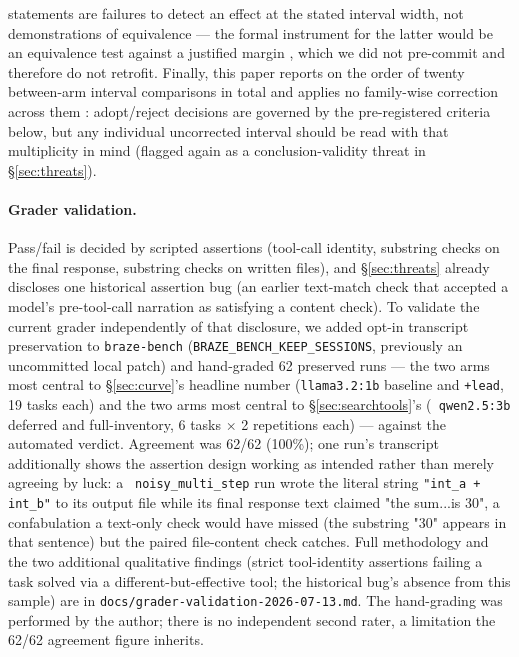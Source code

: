 \documentclass[smallcondensed,natbib]{svjour3}
\begin{document}
statements are failures to detect an effect at the stated interval
width, not demonstrations of equivalence --- the formal instrument for
the latter would be an equivalence test against a justified margin
\citep{lakens2017equivalence}, which we did not pre-commit and
therefore do not retrofit. Finally, this paper reports
on the order of twenty between-arm interval comparisons in total and
applies no family-wise correction across them
\citep[cf.][]{demsar2006statistical}: adopt/reject decisions
are governed by the pre-registered criteria below, but any individual
uncorrected interval should be read with that multiplicity in mind
(flagged again as a conclusion-validity threat in
\S\ref{sec:threats}).

\paragraph{Grader validation.} Pass/fail is decided by scripted
assertions (tool-call identity, substring checks on the final response,
substring checks on written files), and \S\ref{sec:threats} already
discloses one historical assertion bug (an earlier text-match check
that accepted a model's pre-tool-call narration as satisfying a content
check). To validate the current grader independently of that
disclosure, we added opt-in transcript preservation to
\texttt{braze-bench} (\texttt{BRAZE\_BENCH\_KEEP\_SESSIONS}, previously
an uncommitted local patch) and hand-graded 62 preserved runs --- the
two arms most central to \S\ref{sec:curve}'s headline number
(\texttt{llama3.2:1b} baseline and \texttt{+lead}, 19 tasks each) and
the two arms most central to \S\ref{sec:searchtools}'s (\texttt{
qwen2.5:3b} deferred and full-inventory, 6 tasks $\times$ 2 repetitions
each) --- against the automated verdict. Agreement was 62/62 (100\%);
one run's transcript additionally shows the assertion design working as
intended rather than merely agreeing by luck: a \texttt{
noisy\_multi\_step} run wrote the literal string \texttt{"int\_a +
int\_b"} to its output file while its final response text claimed "the
sum...is 30", a confabulation a text-only check would have missed
(the substring "30" appears in that sentence) but the paired
file-content check catches. Full methodology and the two additional
qualitative findings (strict tool-identity assertions failing a
task solved via a different-but-effective tool; the historical bug's
absence from this sample) are in
\texttt{docs/grader-validation-2026-07-13.md}. The hand-grading was
performed by the author; there is no independent second rater, a
limitation the 62/62 agreement figure inherits.
\end{document}

